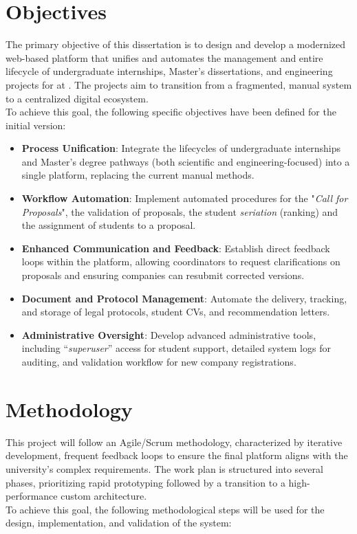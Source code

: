 \section{Objectives}
  \label{sec:intro_objectives}

  \ntindex[Template]{}
  The primary objective of this dissertation is to design and develop a modernized web-based platform that 
  unifies and automates the management and entire lifecycle of undergraduate internships, Master's dissertations, 
  and engineering projects for  at  . The projects aim to transition from a fragmented, manual system 
  to a centralized digital ecosystem.
  \\
  To achieve this goal, the following specific objectives have been defined for the initial version:
  
  \begin{itemize}
    \item {\textbf{Process Unification}: Integrate the lifecycles of undergraduate internships and Master's degree pathways (both scientific and engineering-focused) into a single platform, replacing the current manual methods.}
    \item {\textbf{Workflow Automation}: Implement automated procedures for the "\textit{Call for Proposals}", the validation of proposals, the student \textit{seriation} (ranking) and the assignment of students to a proposal.}
    \item {\textbf{Enhanced Communication and Feedback}: Establish direct feedback loops within the platform, allowing coordinators to request clarifications on proposals and ensuring companies can resubmit corrected versions.}
    \item {\textbf{Document and Protocol Management}: Automate the delivery, tracking, and storage of legal protocols, student CVs, and recommendation letters.}
    \item {\textbf{Administrative Oversight}: Develop advanced administrative tools, including “\textit{superuser}” access for student support, detailed system logs for auditing, and validation workflow for new company registrations.}
  \end{itemize}


\section{Methodology}
  \label{sec:intro_methodology}

  \ntindex[Template]{}
  This project will follow an Agile/Scrum methodology, 
  characterized by iterative development, 
  frequent feedback loops \cite{scrum-guide-2020} to ensure the final 
  platform aligns with the university’s complex requirements. 
  The work plan is structured into several phases, 
  prioritizing rapid prototyping followed by a transition to a 
  high-performance custom architecture.
  \\
  To achieve this goal, the following methodological steps 
  will be used for the design, implementation, and validation of the system:
  
